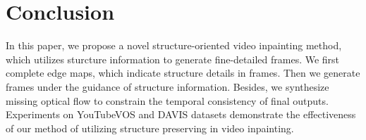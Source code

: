 \section{Conclusion}
In this paper, we propose a novel structure-oriented video inpainting method, which utilizes sturcture information to generate fine-detailed frames. We first complete edge maps, which indicate structure details in frames. Then we generate frames under the guidance of structure information. Besides, we synthesize missing optical flow to constrain the temporal consistency of final outputs.
Experiments on YouTubeVOS and DAVIS datasets demonstrate the effectiveness of our method of utilizing structure preserving in video inpainting.


 
